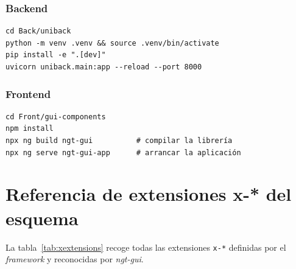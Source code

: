 \subsection{Backend}

\begin{verbatim}
cd Back/uniback
python -m venv .venv && source .venv/bin/activate
pip install -e ".[dev]"
uvicorn uniback.main:app --reload --port 8000
\end{verbatim}

\subsection{Frontend}

\begin{verbatim}
cd Front/gui-components
npm install
npx ng build ngt-gui          # compilar la librería
npx ng serve ngt-gui-app      # arrancar la aplicación
\end{verbatim}


\chapter{Referencia de extensiones x-* del esquema}
\label{ap:xextensions}

La tabla~\ref{tab:xextensions} recoge todas las extensiones \texttt{x-*} definidas por el
\textit{framework} y reconocidas por \textit{ngt-gui}.

